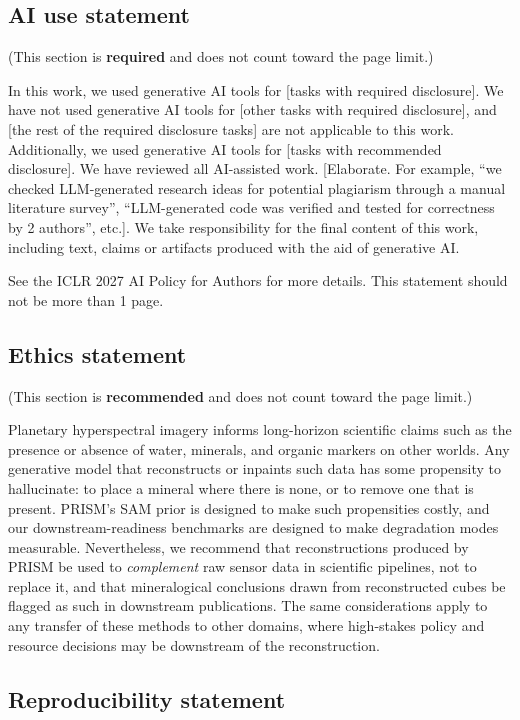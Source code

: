 \documentclass{article} %
\begin{document}
\subsection*{AI use statement}

(This section is \textbf{required} and does not count toward the page limit.)

In this work, we used generative AI tools for [tasks with required disclosure].
We have not used generative AI tools for [other tasks with required disclosure],
and [the rest of the required disclosure tasks] are not applicable to this work.
Additionally, we used generative AI tools for [tasks with recommended
disclosure]. We have reviewed all AI-assisted work. [Elaborate. For example, ``we
checked LLM-generated research ideas for potential plagiarism through a manual
literature survey'', ``LLM-generated code was verified and tested for correctness
by 2 authors'', etc.]. We take responsibility for the final content of this work,
including text, claims or artifacts produced with the aid of generative AI.

See the ICLR 2027 AI Policy for Authors for more details. This statement should
not be more than 1 page.

\subsection*{Ethics statement}

(This section is \textbf{recommended} and does not count toward the page limit.)

Planetary hyperspectral imagery informs long-horizon scientific claims such as the presence or absence of water, minerals, and organic markers on other worlds. Any generative model that reconstructs or inpaints such data has some propensity to hallucinate: to place a mineral where there is none, or to remove one that is present. PRISM's SAM prior is designed to make such propensities costly, and our downstream-readiness benchmarks are designed to make degradation modes measurable. Nevertheless, we recommend that reconstructions produced by PRISM be used to \emph{complement} raw sensor data in scientific pipelines, not to replace it, and that mineralogical conclusions drawn from reconstructed cubes be flagged as such in downstream publications. The same considerations apply to any transfer of these methods to other domains, where high-stakes policy and resource decisions may be downstream of the reconstruction.

\subsection*{Reproducibility statement}
\end{document}
